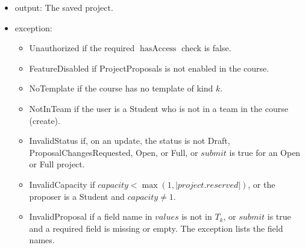 \documentclass[12pt, titlepage]{article}
\begin{document}
\begin{itemize}
\begin{itemize}
        \item \emph{Submit}: If $submit$ is true, the saved project has status Draft or ProposalChangesRequested, $\operatorname{isFeatureEnabled}(user,c,\text{ProjectProposals})=\text{true}$ for its course $c$, and every field marked required in $T_k$ is present and non-empty in its fields, its status becomes ProposalSubmitted. Call $\operatorname{recordPendingWork}(c,\text{ProjectProposals},project.id,\text{true})$ and $\operatorname{notify}(\text{StatusChanged},project)$.
    \end{itemize}
    Persist and audit the change.
    \item output: The saved project.
    \item exception:
    \begin{itemize}
        \item Unauthorized if the required $\operatorname{hasAccess}$ check is false.
        \item FeatureDisabled if ProjectProposals is not enabled in the course.
        \item NoTemplate if the course has no template of kind $k$.
        \item NotInTeam if the user is a Student who is not in a team in the course (create).
        \item InvalidStatus if, on an update, the status is not Draft, ProposalChangesRequested, Open, or Full, or $submit$ is true for an Open or Full project.
        \item InvalidCapacity if $capacity<\max(1,|project.reserved|)$, or the proposer is a Student and $capacity\ne1$.
        \item InvalidProposal if a field name in $values$ is not in $T_k$, or $submit$ is true and a required field is missing or empty. The exception lists the field names.
    \end{itemize}
\end{itemize}
\end{document}
